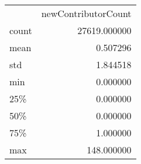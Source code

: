 \begin{tabular}{lr}
 & newContributorCount \\
count & 27619.000000 \\
mean & 0.507296 \\
std & 1.844518 \\
min & 0.000000 \\
25\% & 0.000000 \\
50\% & 0.000000 \\
75\% & 1.000000 \\
max & 148.000000 \\
\end{tabular}
